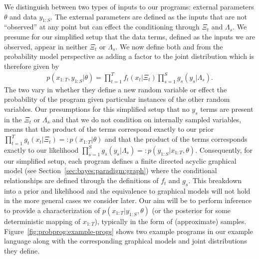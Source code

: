 We distinguish between two types of inputs to our programs: external parameters $\theta$ and data $y_{1:S}$.
The external parameters are defined as the inputs that are 
not ``observed'' at any point but can effect the conditioning through $\Xi_t$ and $\Lambda_s$.
We presume for our simplified setup that the data terms, defined as the inputs we are observed, 
appear in neither $\Xi_t$ or $\Lambda_s$.
We now define both \sample and \observe from the probability model perspective
as adding a factor to the joint distribution which is therefore given by
\begin{align}
\label{eq:probprog:simple-joint}
p(x_{1:T},y_{1:S} | \theta) = \prod_{t=1}^{T} f_t(x_t | \Xi_t) \prod_{s=1}^{S} g_s(y_s|\Lambda_s).
\end{align}
The two vary in whether they define a new random variable or effect the probability of the
program given particular instances of the other random variables.
Our presumptions for this simplified setup that no $y_{s}$ terms are present in the $\Xi_t$ or $\Lambda_s$
and that we do not condition on internally sampled variables, means that the product of the \sample terms
correspond exactly to our prior $\prod_{t=1}^{T} g_t(x_t | \Xi_t) =: p(x_{1:T} | \theta)$ and that the
product of the \observe terms corresponds exactly to our likelihood
$\prod_{s=1}^{S} g_s(y_s|\Lambda_s) =: p(y_{1:S} | x_{1:T}, \theta)$.  Consequently, for our simplified setup,
each program defines a finite directed acyclic graphical model (see Section~\ref{sec:bayes:paradigm:graph})
where the conditional relationships are defined through the definitions of $f_t$ and $g_s$.
This breakdown into a prior and likelihood and the equivalence to graphical models
will not hold in the more general cases we consider later.  Our aim will be to perform inference
to provide a characterization of $p(x_{1:T} | y_{1:S}, \theta)$ (or the posterior for some deterministic
mapping of $x_{1:T}$), typically in the form of (approximate)
samples.  Figure~\ref{fig:probprog:example-progs} shows two example programs in our example
language along with the corresponding graphical models and joint distributions they define.

